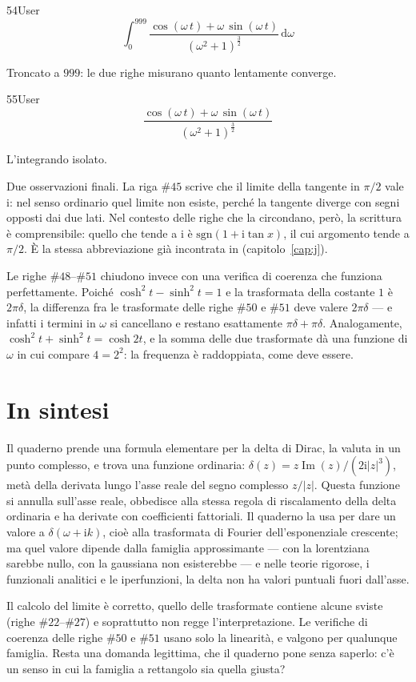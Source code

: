 \begin{espr}{54}{User}{}
\[
\int_{0}^{999} \frac{\cos\!\left(\omega\, t\right) + \omega\, \sin\!\left(\omega\, t\right)}{\left(\omega^{2} + 1\right)^{\frac{3}{2}}} \,\mathrm{d}\omega
\]
\end{espr}
Troncato a $999$: le due righe misurano quanto lentamente converge.

\begin{espr}{55}{User}{}
\[
\frac{\cos\!\left(\omega\, t\right) + \omega\, \sin\!\left(\omega\, t\right)}{\left(\omega^{2} + 1\right)^{\frac{3}{2}}}
\]
\end{espr}
L'integrando isolato.


Due osservazioni finali. La riga $\#45$ scrive che il limite della tangente in $\pi/2$ vale $\mathrm{i}$: nel senso ordinario quel limite non esiste, perché la tangente diverge con segni opposti dai due lati. Nel contesto delle righe che la circondano, però, la scrittura è comprensibile: quello che tende a $\mathrm{i}$ è $\mathrm{sgn}\!\left(1+\mathrm{i}\tan x\right)$, il cui argomento tende a $\pi/2$. È la stessa abbreviazione già incontrata in  (capitolo~\ref{cap:j}).

Le righe $\#48$--$\#51$ chiudono invece con una verifica di coerenza che funziona perfettamente. Poiché $\cosh^2t-\sinh^2t=1$ e la trasformata della costante $1$ è $2\pi\delta$, la differenza fra le trasformate delle righe $\#50$ e $\#51$ deve valere $2\pi\delta$ — e infatti i termini in $\omega$ si cancellano e restano esattamente $\pi\delta+\pi\delta$. Analogamente, $\cosh^2t+\sinh^2t=\cosh2t$, e la somma delle due trasformate dà una funzione di $\omega$ in cui compare $4=2^2$: la frequenza è raddoppiata, come deve essere.

\section*{In sintesi}

Il quaderno prende una formula elementare per la delta di Dirac, la valuta in un punto complesso, e trova una funzione ordinaria: $\delta(z)=z\operatorname{Im}(z)/\left(2\mathrm{i}|z|^3\right)$, metà della derivata lungo l'asse reale del segno complesso $z/|z|$. Questa funzione si annulla sull'asse reale, obbedisce alla stessa regola di riscalamento della delta ordinaria e ha derivate con coefficienti fattoriali. Il quaderno la usa per dare un valore a $\delta(\omega+\mathrm{i}k)$, cioè alla trasformata di Fourier dell'esponenziale crescente; ma quel valore dipende dalla famiglia approssimante — con la lorentziana sarebbe nullo, con la gaussiana non esisterebbe — e nelle teorie rigorose, i funzionali analitici e le iperfunzioni, la delta non ha valori puntuali fuori dall'asse.

Il calcolo del limite è corretto, quello delle trasformate contiene alcune sviste (righe $\#22$–$\#27$) e soprattutto non regge l'interpretazione. Le verifiche di coerenza delle righe $\#50$ e $\#51$ usano solo la linearità, e valgono per qualunque famiglia. Resta una domanda legittima, che il quaderno pone senza saperlo: c'è un senso in cui la famiglia a rettangolo sia quella giusta?

